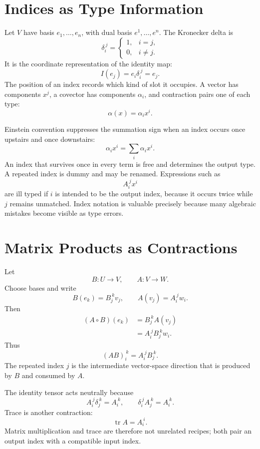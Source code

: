
\section{Indices as Type Information}

Let \(V\) have basis \(e_1,\ldots,e_n\), with dual basis \(e^1,\ldots,e^n\).  The Kronecker delta is
\[
  \delta_i^{\ j}
  =
  \begin{cases}
    1,&i=j,\\
    0,&i\ne j.
  \end{cases}
\]
It is the coordinate representation of the identity map:
\[
  I(e_j)=e_i\delta_i^{\ j}=e_j.
\]
The position of an index records which kind of slot it occupies.  A vector has components \(x^j\), a covector has components \(\alpha_i\), and contraction pairs one of each type:
\[
  \alpha(x)=\alpha_i x^i.
\]

Einstein convention suppresses the summation sign when an index occurs once upstairs and once downstairs:
\[
  \alpha_i x^i
  =\sum_i\alpha_i x^i.
\]
An index that survives once in every term is free and determines the output type.  A repeated index is dummy and may be renamed.  Expressions such as
\[
  A_i^{\ j}x^i
\]
are ill typed if \(i\) is intended to be the output index, because it occurs twice while \(j\) remains unmatched.  Index notation is valuable precisely because many algebraic mistakes become visible as type errors.

\section{Matrix Products as Contractions}

Let
\[
  B:U\to V,
  \qquad
  A:V\to W.
\]
Choose bases and write
\[
  B(e_k)=B_j^{\ k}v_j,
  \qquad
  A(v_j)=A_i^{\ j}w_i.
\]
Then
\[
\begin{aligned}
  (A\circ B)(e_k)
  &=B_j^{\ k}A(v_j)\\
  &=A_i^{\ j}B_j^{\ k}w_i.
\end{aligned}
\]
Thus
\[
  (AB)_i^{\ k}=A_i^{\ j}B_j^{\ k}.
\]
The repeated index \(j\) is the intermediate vector-space direction that is produced by \(B\) and consumed by \(A\).

The identity tensor acts neutrally because
\[
  A_i^{\ j}\delta_j^{\ k}=A_i^{\ k},
  \qquad
  \delta_i^{\ j}A_j^{\ k}=A_i^{\ k}.
\]
Trace is another contraction:
\[
  \operatorname{tr}A=A_i^{\ i}.
\]
Matrix multiplication and trace are therefore not unrelated recipes; both pair an output index with a compatible input index.

